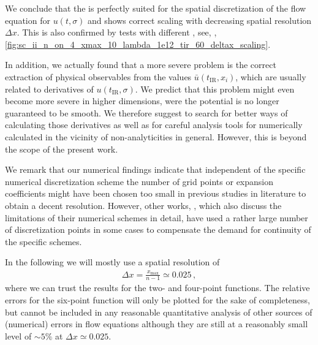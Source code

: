 We conclude that the \ktScheme{} is perfectly suited for the spatial discretization of the \frg{} flow equation for $u ( t, \sigma )$ and shows correct scaling with decreasing spatial resolution $\Delta x$. 
This is also confirmed by tests with different \ics{}, see, \eg{}, \cref{fig:sc_ii_n_on_4_xmax_10_lambda_1e12_tir_60_deltax_scaling}.

In addition, we actually found that a more severe problem is the correct extraction of physical observables from the \ir{} values $\bar{u} ( t_\mathrm{IR}, x_i )$, which are usually related to derivatives of $u ( t_\mathrm{IR}, \sigma )$.
We predict that this problem might even become more severe in higher dimensions, were the \ir{} potential is no longer guaranteed to be smooth.
We therefore suggest to search for better ways of calculating those derivatives as well as for careful analysis tools for numerically calculated \ipi{} \nptFunctions{} in the vicinity of non-analyticities in general.
However, this is beyond the scope of the present work.

We remark that our numerical findings indicate that \dash{} independent of the specific numerical discretization scheme \dash{} the number of grid points or expansion coefficients might have been chosen too small in previous \frg{} studies in literature to obtain a decent resolution.
However, other works, \cf{} , which also discuss the limitations of their numerical schemes in detail, have used a rather large number of discretization points \dash{} in some cases to compensate the demand for continuity of the specific schemes.

In the following we will mostly use a spatial resolution of 
	\begin{align}
		\Delta x = \frac{x_\mathrm{max}}{n - 1} \simeq 0.025 \, ,
	\end{align}
where we can trust the results for the two- and four-point functions.
The relative errors for the six-point function will only be plotted for the sake of completeness, but cannot be included in any reasonable quantitative analysis of other sources of (numerical) errors in \frg{} flow equations although they are still at a reasonably small level of $\sim 5\%$ at $\Delta x \simeq 0.025$.

